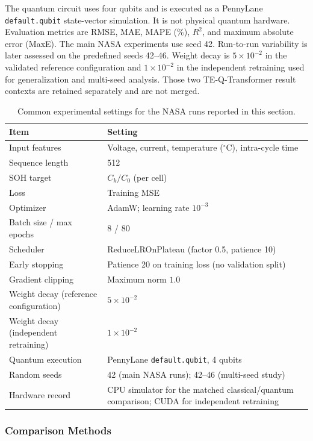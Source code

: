 The quantum circuit uses four qubits and is executed as a PennyLane \mbox{\texttt{default.qubit}} state-vector simulation. It is not physical quantum hardware. Evaluation metrics are RMSE, MAE, MAPE (\%), $R^2$, and maximum absolute error (MaxE). The main NASA experiments use seed 42. Run-to-run variability is later assessed on the predefined seeds 42--46. Weight decay is $5\times10^{-2}$ in the validated reference configuration and $1\times10^{-2}$ in the independent retraining used for generalization and multi-seed analysis. Those two TE-Q-Transformer result contexts are retained separately and are not merged.

\begin{table}[htbp]
\centering
\footnotesize
\caption{Common experimental settings for the NASA runs reported in this section.}\label{tab:exp_settings}
\begin{tabular*}{\textwidth}{@{}LL@{}}
\toprule
Item & Setting \\
\midrule
Input features & Voltage, current, temperature ($^\circ$C), intra-cycle time \\
Sequence length & 512 \\
SOH target & $C_k/C_0$ (per cell) \\
Loss & Training MSE \\
Optimizer & AdamW; learning rate $10^{-3}$ \\
Batch size / max epochs & 8 / 80 \\
Scheduler & ReduceLROnPlateau (factor 0.5, patience 10) \\
Early stopping & Patience 20 on training loss (no validation split) \\
Gradient clipping & Maximum norm $1.0$ \\
Weight decay (reference configuration) & $5\times10^{-2}$ \\
Weight decay (independent retraining) & $1\times10^{-2}$ \\
Quantum execution & PennyLane \mbox{\texttt{default.qubit}}, 4 qubits \\
Random seeds & 42 (main NASA runs); 42--46 (multi-seed study) \\
Hardware record & CPU simulator for the matched classical/quantum comparison; CUDA for independent retraining \\
\bottomrule
\end{tabular*}
\end{table}

\subsubsection{Comparison Methods}
\label{sec:baseline_comparison}

